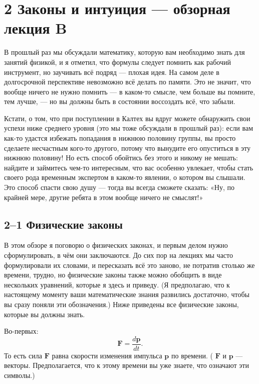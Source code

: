\documentclass[11pt,oneside]{article}
\providecommand{\ddt}[2]{\frac{d#1}{d#2}}
\providecommand{\FLPF}{\mathbf{F}}
\providecommand{\FLPp}{\mathbf{p}}
\begin{document}
\clearpage

\section*{2 Законы и интуиция --- обзорная лекция B}


В прошлый раз мы обсуждали математику, которую вам необходимо знать для занятий физикой, и я отметил, что формулы следует помнить как рабочий инструмент, но заучивать всё подряд --- плохая идея. На самом деле в долгосрочной перспективе невозможно всё делать по памяти. Это не значит, что вообще ничего не нужно помнить --- в каком-то смысле, чем больше вы помните, тем лучше, --- но вы должны быть в состоянии воссоздать всё, что забыли.\par

Кстати, о том, что при поступлении в Калтех вы вдруг можете обнаружить свои успехи ниже среднего уровня (это мы тоже обсуждали в прошлый раз): если вам как-то удастся избежать попадания в нижнюю половину группы, вы просто сделаете несчастным кого-то другого, потому что вынудите его опуститься в эту нижнюю половину! Но есть способ обойтись без этого и никому не мешать: найдите и займитесь чем-то интересным, что вас особенно увлекает, чтобы стать своего рода временным экспертом в каком-то явлении, о котором вы слышали. Это способ спасти свою душу --- тогда вы всегда сможете сказать: «Ну, по крайней мере, другие ребята в этом вообще ничего не смыслят!»\par

\subsection*{2--1 Физические законы}

В этом обзоре я поговорю о физических законах, и первым делом нужно сформулировать, в чём они заключаются. До сих пор на лекциях мы часто формулировали их словами, и пересказать всё это заново, не потратив столько же времени, трудно, но физические законы также можно обобщить в виде нескольких уравнений, которые я здесь и приведу. (Я предполагаю, что к настоящему моменту ваши математические знания развились достаточно, чтобы вы сразу поняли эти обозначения.) Ниже приведены все физические законы, которые вы должны знать.\par

Во-первых: 
\begin{equation*} \tag{2.1}
\label{Eq:TIPS:2:1} \FLPF = \ddt{\FLPp}{t}. \end{equation*}
 То есть сила \(\FLPF\) равна скорости изменения импульса \(\FLPp\) по времени. ( \(\FLPF\) и \(\FLPp\) --- векторы. Предполагается, что к этому времени вы уже знаете, что означают эти символы.)\par
\end{document}
